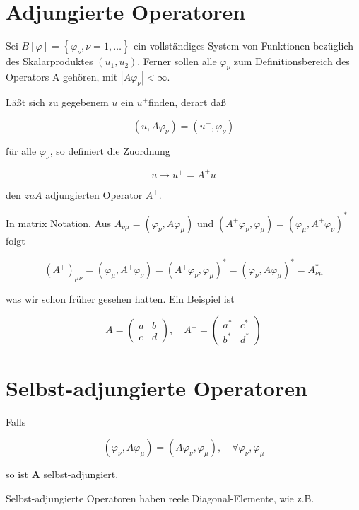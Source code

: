 \documentclass[10pt, letterpaper]{article}
\begin{document}
\section*{Adjungierte Operatoren}
Sei $B[\varphi]=\left\{\varphi_{\nu}, \nu=1, \ldots\right\}$ ein vollständiges System von Funktionen bezüglich des Skalarproduktes $\left(u_{1}, u_{2}\right)$. Ferner sollen alle $\varphi_{\nu}$ zum Definitionsbereich des Operators A gehören, mit $\left|A \varphi_{\nu}\right|<\infty$.

Läßt sich zu gegebenem $u$ ein $u^{+}$finden, derart daß

$$
\left(u, A \varphi_{\nu}\right)=\left(u^{+}, \varphi_{\nu}\right)
$$

für alle $\varphi_{\nu}$, so definiert die Zuordnung

$$
u \rightarrow u^{+}=A^{+} u
$$

den $z u A$ adjungierten Operator $A^{+}$.

In matrix Notation. Aus $A_{\nu \mu}=\left(\varphi_{\nu}, A \varphi_{\mu}\right)$ und $\left(A^{+} \varphi_{\nu}, \varphi_{\mu}\right)=\left(\varphi_{\mu}, A^{+} \varphi_{\nu}\right)^{*}$ folgt

$$
\left(A^{+}\right)_{\mu \nu}=\left(\varphi_{\mu}, A^{+} \varphi_{\nu}\right)=\left(A^{+} \varphi_{\nu}, \varphi_{\mu}\right)^{*}=\left(\varphi_{\nu}, A \varphi_{\mu}\right)^{*}=A_{\nu \mu}^{*}
$$

was wir schon früher gesehen hatten. Ein Beispiel ist

$$
A=\left(\begin{array}{cc}
a & b \\
c & d
\end{array}\right), \quad A^{+}=\left(\begin{array}{cc}
a^{*} & c^{*} \\
b^{*} & d^{*}
\end{array}\right)
$$

\section*{Selbst-adjungierte Operatoren}
Falls

$$
\left(\varphi_{\nu}, A \varphi_{\mu}\right)=\left(A \varphi_{\nu}, \varphi_{\mu}\right), \quad \forall \varphi_{\nu}, \varphi_{\mu}
$$

so ist $\mathbf{A}$ selbst-adjungiert.

Selbst-adjungierte Operatoren haben reele Diagonal-Elemente, wie z.B.
\end{document}
